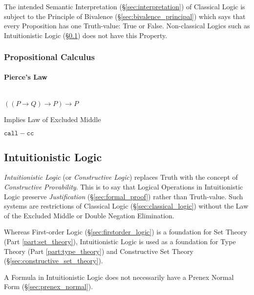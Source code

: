 The intended Semantic Interpretation (\S\ref{sec:interpretation}) of
Classical Logic is subject to the Principle of Bivalence
(\S\ref{sec:bivalence_principal}) which says that every Proposition
has one Truth-value: True or False. Non-classical Logics such as
Intuitionistic Logic (\S\ref{sec:intuitionistic_logic}) does not have
this Property.



\subsubsection{Propositional Calculus}
\label{sec:propositional_calculus}

\paragraph{Pierce's Law}\label{sec:pierces_law}
\hfill \\

$((P \rightarrow Q) \rightarrow P) \rightarrow P$

Implies Law of Excluded Middle

$\mathtt{call-cc}$ %



\subsection{Intuitionistic Logic}\label{sec:intuitionistic_logic}

\emph{Intuitionistic Logic} (or \emph{Constructive Logic}) replaces
Truth with the concept of \emph{Constructive Provability}. This is to
say that Logical Operations in Intuitionistic Logic preserve
\emph{Justification} (\S\ref{sec:formal_proof}) rather than
Truth-value. Such systems are restrictions of Classical Logic
(\S\ref{sec:classical_logic}) without the Law of the Excluded Middle
or Double Negation Elimination.

Whereas First-order Logic (\S\ref{sec:firstorder_logic}) is a
foundation for Set Theory (Part \ref{part:set_theory}), Intuitionistic
Logic is used as a foundation for Type Theory (Part
\ref{part:type_theory}) and Constructive Set Theory
(\S\ref{sec:constructive_set_theory}).

A Formula in Intuitionistic Logic does not necessarily have a Prenex
Normal Form (\S\ref{sec:prenex_normal}).

